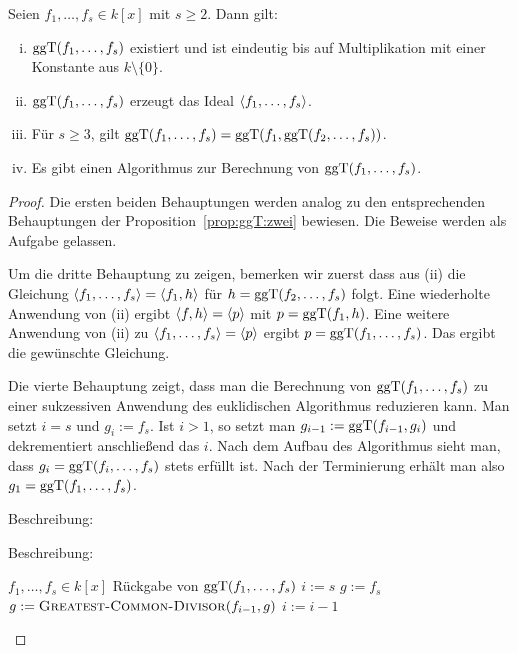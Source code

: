 \documentclass[11pt]{article}
\numberwithin{equation}{section}
\begin{document}
\begin{proposition} 
	Seien $f_1,\ldots,f_s \in k[x]$ mit $s \ge 2$. Dann gilt: 
	\begin{enumerate}[(i)]
		\item $\operatorname{ggT}(f_1,\ldots,f_s)$ existiert und ist eindeutig bis auf Multiplikation mit einer Konstante aus $k \setminus \{0\}$. 
		\item $\operatorname{ggT}(f_1,\ldots,f_s)$ erzeugt das Ideal $\left< f_1,\ldots,f_s \right>$. 
		\item Für $s \ge 3$, gilt $\operatorname{ggT}(f_1,\ldots,f_s) = \operatorname{ggT}(f_1, \operatorname{ggT}(f_2,\ldots,f_s))$. 
		\item Es gibt einen Algorithmus zur Berechnung von $\operatorname{ggT}(f_1,\ldots,f_s)$. 
	\end{enumerate} 
\end{proposition} 
\begin{proof} 
	Die ersten beiden Behauptungen werden analog zu den entsprechenden Behauptungen der Proposition~\ref{prop:ggT:zwei} bewiesen. Die Beweise werden als Aufgabe gelassen.
	
	Um die dritte Behauptung zu zeigen, bemerken wir zuerst dass aus (ii) die Gleichung $\left< f_1,\ldots,f_s \right> = \left< f_1,h \right>$ für $h = \operatorname{ggT}(f_2,\ldots,f_s)$ folgt. Eine wiederholte Anwendung von (ii) ergibt $\left< f,h \right> = \left< p \right>$ mit $p = \operatorname{ggT}(f_1, h)$. Eine weitere Anwendung von (ii) zu $\left< f_1,\ldots,f_s \right> = \left< p \right>$ ergibt $p = \operatorname{ggT}(f_1,\ldots,f_s)$. Das ergibt die gewünschte Gleichung. 
	
	Die vierte Behauptung zeigt, dass man die Berechnung von $\operatorname{ggT}(f_1,\ldots,f_s)$ zu einer sukzessiven Anwendung des euklidischen Algorithmus reduzieren kann. Man setzt $i=s$ und $g_i := f_s$. Ist $i >1$, so setzt man $g_{i-1} := \operatorname{ggT}(f_{i-1},g_i)$ und dekrementiert anschließend das $i$. Nach dem Aufbau des Algorithmus sieht man, dass $g_i = \operatorname{ggT}(f_i,\ldots,f_s)$ stets erfüllt ist. Nach der Terminierung erhält man also $g_1 = \operatorname{ggT}(f_1,\ldots,f_s)$.
	
	Beschreibung: 
	
	Beschreibung: 

\begin{algorithm}[H]
	\caption{$\cc{Greatest-Common-Divisor-for-List}(f_1,....,f_s)$}
	\begin{algorithmic}[1]
		\REQUIRE $f_1,\ldots,f_s \in k[x]$
		\ENSURE Rückgabe von $\operatorname{ggT}(f_1,\ldots,f_s)$
		\STATE $i:=s$
		\STATE $g:=f_s$
		\STATE{}
		\STATE $g:= \mathop{\text{\textsc{Greatest-Common-Divisor}}}(f_{i-1},g)$
		\STATE $i:=i-1$
		\ENDWHILE 
	\end{algorithmic}
\end{algorithm}

	
\end{proof} 
\end{document}
